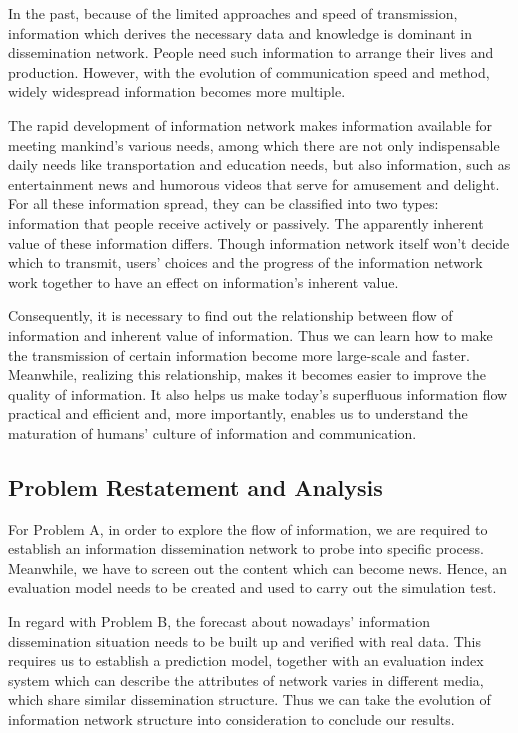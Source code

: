 \documentclass[a4paper,11pt]{article}
\begin{document}
\par In the past, because of the limited approaches and speed of transmission, information which derives the necessary data and knowledge is dominant in dissemination network. People need such information to arrange their lives and production. However, with the evolution of communication speed and method, widely widespread information becomes more multiple.
\par The rapid development of information network makes information available for meeting mankind's various needs, among which there are not  only indispensable daily needs like transportation and education needs, but also information, such as entertainment news and humorous videos that serve for amusement and delight. For all these information spread, they can be classified into two types: information that people receive actively or passively. The apparently inherent value of these information differs. Though information network itself won't decide which to transmit, users' choices and the progress of the information network work together to have an effect on information's inherent value.
\par Consequently, it is necessary to find out the relationship between flow of information and inherent value of information. Thus we can learn how to make the transmission of certain information become more large-scale and faster. Meanwhile, realizing this relationship, makes it becomes easier to improve the quality of information. It also helps us make today's superfluous information flow practical and efficient and, more importantly, enables us to understand the maturation of humans' culture of information and communication.






\subsection{Problem Restatement and Analysis}
\par For Problem A, in order to explore the flow of information, we are required to establish an information dissemination network to probe into specific process. Meanwhile, we have to screen out the content which can become news. Hence, an evaluation model needs to be created and used to carry out the simulation test.

\par In regard with Problem B, the forecast about nowadays' information dissemination situation needs to be built up and verified with real data. This requires us to establish a prediction model, together with an evaluation index system which can describe the attributes of network varies in different media, which share similar dissemination structure. Thus we can take the evolution of information network structure into consideration to conclude our results.
\end{document}
